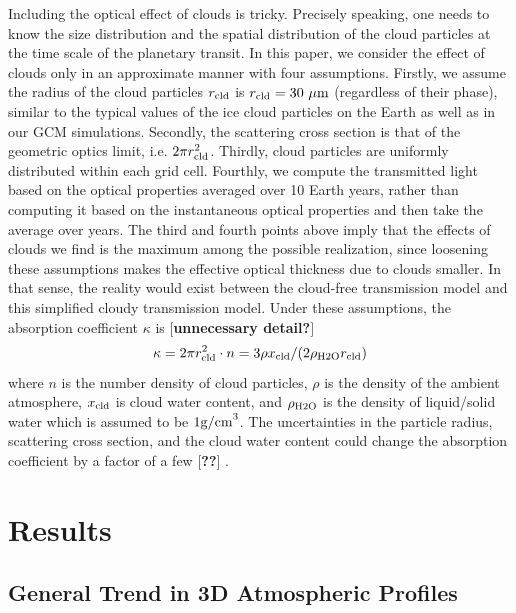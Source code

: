 \documentclass[11pt,numberedappendix,twocolappendix,]{emulateapj}
\def\memo#1{\color{red}$[${\bf #1}$]$ \color{black}}
\begin{document}
Including the optical effect of clouds is tricky. 
Precisely speaking, one needs to know the size distribution and the spatial distribution of the cloud particles at the time scale of the planetary transit. 
In this paper, we consider the effect of clouds only in an approximate manner with four assumptions. 
%
Firstly, we assume the radius of the cloud particles $r_{\rm cld}$ is $r_{\rm cld}=30~\mu {\rm m}$ (regardless of their phase), similar to the typical values of the ice cloud particles on the Earth as well as in our GCM simulations.  
%
Secondly, the scattering cross section is that of the geometric optics limit, i.e. $2 \pi r_{\rm cld}^2$. 
%
Thirdly, cloud particles are uniformly distributed within each grid cell. 
%
Fourthly, we compute the transmitted light based on the optical properties  averaged over 10 Earth years, rather than computing it based on the instantaneous optical properties and then take the average over years. 
%
The third and fourth points above imply that the effects of clouds we find is the maximum among the possible realization, since loosening these assumptions makes the effective optical thickness due to clouds smaller. 
In that sense, the reality would exist between the cloud-free transmission model and this simplified cloudy transmission model. 
Under these assumptions, the absorption coefficient $\kappa $ is \memo{unnecessary detail?}
\begin{equation}
\kappa = 2 \pi r_{\rm cld}^2 \cdot n = 3 \rho x_{\rm cld} / ( 2 \rho_{\rm H2O} r_{\rm cld} )
\end{equation}
where $n$ is the number density of cloud particles, $\rho $ is the density of the ambient atmosphere, $x_{\rm cld}$ is cloud water content, and $\rho_{\rm H2O}$ is the density of liquid/solid water which is assumed to be $1 {\rm g/cm}^3$. 
The uncertainties in the particle radius, scattering cross section, and the cloud water content could change the absorption coefficient by a factor of a few \memo{??}. 



\section{Results}
\label{s:results}


\subsection{General Trend in 3D Atmospheric Profiles}
\label{ss:result_H2Omixingratio}
\end{document}
